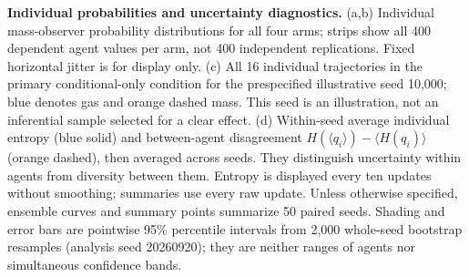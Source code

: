 \documentclass[10pt]{article}
\begin{document}
\textbf{Individual probabilities and uncertainty diagnostics.} (a,b) Individual mass-observer probability distributions for all four arms; strips show all 400 dependent agent values per arm, not 400 independent replications. Fixed horizontal jitter is for display only. (c) All 16 individual trajectories in the primary conditional-only condition for the prespecified illustrative seed 10,000; blue denotes gas and orange dashed mass. This seed is an illustration, not an inferential sample selected for a clear effect. (d) Within-seed average individual entropy (blue solid) and between-agent disagreement $H(\langle q_i\rangle)-\langle H(q_i)\rangle$ (orange dashed), then averaged across seeds. They distinguish uncertainty within agents from diversity between them. Entropy is displayed every ten updates without smoothing; summaries use every raw update. Unless otherwise specified, ensemble curves and summary points summarize 50 paired seeds. Shading and error bars are pointwise 95\% percentile intervals from 2,000 whole-seed bootstrap resamples (analysis seed 20260920); they are neither ranges of agents nor simultaneous confidence bands. \clearpage
\end{document}

